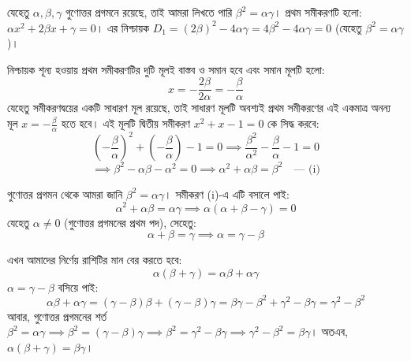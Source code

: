 \documentclass[12pt, a4paper]{article}
\begin{document}
\begin{tcolorbox}[solutionbox={সমাধান (Solution)}]
    \noindent
    যেহেতু $\alpha, \beta, \gamma$ গুণোত্তর প্রগমনে রয়েছে, তাই আমরা লিখতে পারি $\beta^2 = \alpha\gamma$।
    প্রথম সমীকরণটি হলো: $\alpha x^2 + 2\beta x + \gamma = 0$। 
    এর নিশ্চায়ক $D_1 = (2\beta)^2 - 4\alpha\gamma = 4\beta^2 - 4\alpha\gamma = 0$ (যেহেতু $\beta^2 = \alpha\gamma$)।
    
    \vspace{0.5em}
    নিশ্চায়ক শূন্য হওয়ায় প্রথম সমীকরণটির দুটি মূলই বাস্তব ও সমান হবে এবং সমান মূলটি হলো:
    \[ x = -\frac{2\beta}{2\alpha} = -\frac{\beta}{\alpha} \]
    যেহেতু সমীকরণদ্বয়ের একটি সাধারণ মূল রয়েছে, তাই সাধারণ মূলটি অবশ্যই প্রথম সমীকরণের এই একমাত্র অনন্য মূল $x = -\frac{\beta}{\alpha}$ হতে হবে।
    এই মূলটি দ্বিতীয় সমীকরণ $x^2 + x - 1 = 0$ কে সিদ্ধ করবে:
    \[ \left(-\frac{\beta}{\alpha}\right)^2 + \left(-\frac{\beta}{\alpha}\right) - 1 = 0 \implies \frac{\beta^2}{\alpha^2} - \frac{\beta}{\alpha} - 1 = 0 \]
    \[ \implies \beta^2 - \alpha\beta - \alpha^2 = 0 \implies \alpha^2 + \alpha\beta = \beta^2 \quad \text{--- (i)} \]
    
    \vspace{0.5em}
    গুণোত্তর প্রগমন থেকে আমরা জানি $\beta^2 = \alpha\gamma$। সমীকরণ (i)-এ এটি বসালে পাই:
    \[ \alpha^2 + \alpha\beta = \alpha\gamma \implies \alpha(\alpha+\beta-\gamma) = 0 \]
    যেহেতু $\alpha \ne 0$ (গুণোত্তর প্রগমনের প্রথম পদ), সেহেতু:
    \[ \alpha + \beta = \gamma \implies \alpha = \gamma - \beta \]
    
    \vspace{0.5em}
    এখন আমাদের নির্ণেয় রাশিটির মান বের করতে হবে:
    \[ \alpha(\beta+\gamma) = \alpha\beta + \alpha\gamma \]
    $\alpha = \gamma - \beta$ বসিয়ে পাই:
    \[ \alpha\beta + \alpha\gamma = (\gamma-\beta)\beta + (\gamma-\beta)\gamma = \beta\gamma - \beta^2 + \gamma^2 - \beta\gamma = \gamma^2 - \beta^2 \]
    আবার, গুণোত্তর প্রগমনের শর্ত $\beta^2 = \alpha\gamma \implies \beta^2 = (\gamma-\beta)\gamma \implies \beta^2 = \gamma^2 - \beta\gamma \implies \gamma^2 - \beta^2 = \beta\gamma$।
    অতএব, $\alpha(\beta+\gamma) = \beta\gamma$।
\end{tcolorbox}

\vspace{1.5em}
\end{document}

